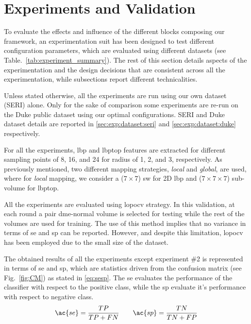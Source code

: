 
\section{Experiments and Validation}
\label{sec:exp} \label{sec:exp:datasets}

To evaluate the effects and influence of the different blocks composing our framework, an experimentation suit has been designed to test different configuration parameters, which are evaluated using different datasets (see Table.~\ref{tab:experiment_summary}).
The rest of this section details aspects of the experimentation and the design decisions that are consistent across all the experimentation, while subsections report different technicalities.

Unless stated otherwise, all the experiments are run using our own dataset (SERI) alone.
Only for the sake of comparison some experiments are re-run on the Duke public dataset using our optimal configurations.
SERI and Duke dataset details are reported in \cref{sec:exp:dataset:seri} and \cref{sec:exp:dataset:duke} respectively.

For all the experiments, \ac{lbp} and \ac{lbptop} features are extracted for different sampling points of 8, 16, and 24 for radius of 1, 2, and 3, respectively.
As previously mentioned, two different mapping strategies, \emph{local} and \emph{global}, are used, where for \emph{local} mapping, we consider a ($7 \times 7$) \acf{sw} for 2D \ac{lbp} and ($ 7 \times 7 \times 7$) sub-volume for \ac{lbptop}.

All the experiments are evaluated using \ac{lopocv} strategy.
In this validation, at each round a pair \ac{dme}-normal volume is selected for testing while the rest of the volumes are used for training.
The use of this method implies that no variance in terms of \ac{se} and \ac{sp} can be reported.
However, and despite this limitation, \ac{lopocv} has been employed due to the small size of the dataset.

The obtained results of all the experiments except experiment \#2 is represented in terms of \ac{se} and \ac{sp}, which are statistics driven from the confusion matrix (see Fig.~\ref{fig:CM}) as stated in \cref{eq:sesp}.
The \ac{se} evaluates the performance of the classifier with respect to the positive class, while the \ac{sp} evaluate it's performance with respect to negative class.
\begin{align}
 \ac{se}  = \frac{TP}{TP+FN} \qquad \ac{sp} = \frac{TN}{TN+FP}
 \label{eq:sesp}
\end{align}

